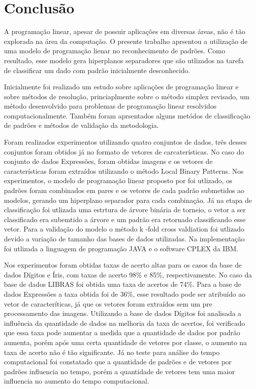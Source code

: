 \chapter{Conclusão}

A programação linear, apesar de possuir aplicações em diversas áreas, não é tão explorada na área da computação. O presente trabalho aprsentou a utilização de uma modelo de programação lienar no reconhecimento de padrões. Como resultado, esse modelo gera hiperplanos separadores que são utlizados na tarefa de classificar um dado com padrão inicialmente desconhecido.

Inicialmente foi realizado um estudo sobre aplicações de programação linear e sobre métodos de resolução, princiaplmente sobre o método simplex revisado, um método desenvolvido para problemas de programação linear resolvidos computacionalmente. Também foram aprsentados alguns metódos de classificação de padrões e métodos de validação da metodologia.

Foram realizados experimentos utilizando quatro conjuntos de dados, três desses conjuntos foram obtidos já no formato de vetores de carcaterísticas. No caso do conjunto de dados Expressões, foram obtidas imagens e os vetores de características foram extraídos utilizando o método Local Binary Patterns. Nos experimentos, o modelo de programação linear proposto por  foi utlizado, os padrões foram combinados em pares e os vetores de cada padrão submetidos ao modelos, gerando um hiperplano separador para cada combinação. Já na etapa de classificação foi utlizada uma estrtura de árvore binária de torneio, o vetor a ser classificado era subemtido a árvore e um padrão era retornado classificando esse vetor. Para a validação do modelo o método k -fold cross valdiation foi utlizado devido a variação de tamanho das bases de dados utilizadas. Na implementação foi utlizada a linguagem de programação JAVA e o software CPLEX da IBM.

Nos experimentos foram obtidas taxas de acerto altas para os casos da base de dados Dígitos e Íris, com taxas de acerto 98\% e 85\%, respectivamente. No caso da base de dados LIBRAS foi obtida uma taxa de acertos de 74\%. Para a base de dados Expressões a taxa obtida foi de 36\%, esse resultado pode ser atribuído ao vetor de caracteríticas, já que os vetores foram extraídos sem um pre processamento das imagens. Utilizando a base de dados Dígitos foi analisada a influência da quantidade de dados na melhoria da taxa de acertos, foi verificado que essa taxa pode aumentar a medida que a quantidade de dados por padrão aumenta, porém após uma certa quantidade de vetores por classe, o aumento na taxa de acerto não é tão significante. Já no teste para análise do tempo computacional foi constatado que a quantidade de padrões e de vetores por padrões influencia no tempo, porém a quantidade de vetores tem uma maior influencia no aumento do tempo computacional.

